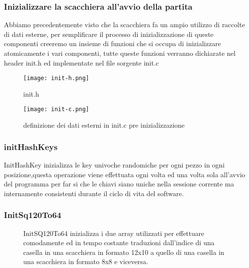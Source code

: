 \subsubsection{Inizializzare la scacchiera all'avvio della partita}
Abbiamo precedentemente visto che la scacchiera fa un ampio utilizzo di raccolte di dati esterne, per semplificare il processo di inizializzazione di queste componenti creeremo un insieme di funzioni che si occupa di inizializzare atomicamente i vari componenti, tutte queste funzioni verranno dichiarate nel header init.h ed implementate nel file sorgente init.c

\begin{figure}[h]
    \centering
    \begin{minipage}[b]{0.4\textwidth}
        \texttt{[image: init-h.png]}
        \caption{init.h}
    \end{minipage}
    \hfill
    \begin{minipage}[b]{0.4\textwidth}
        \texttt{[image: init-c.png]}
        \caption{definizione dei dati esterni in init.c pre inizializzazione }
    \end{minipage}
\end{figure}


\subsubsection{initHashKeys}
\small{InitHashKey inizializza le key univoche randomiche per ogni pezzo in ogni posizione,questa operazione viene effettuata ogni volta ed una volta sola all'avvio del programma per far si che le chiavi siano uniche nella sessione corrente ma internamente consistenti durante il ciclo di vita del software. }
\begin{figure}[h]
 
        \centering {}
\end{figure}

\newpage

\subsubsection{InitSq120To64}
\FloatBarrier
\begin{figure}[h]
    \begin{minipage}[t]{0.63\textwidth}
        \centering {}
    \end{minipage}
    \begin{minipage}[t]{0.35\textwidth}
        {InitSQ120To64 inizializza i due array utilizzati per effettuare comodamente ed in tempo costante traduzioni dall'indice di una casella in una scacchiera in formato 12x10 a quello di una casella in una scacchiera in formato 8x8 e viceversa. }
    \end{minipage}
\end{figure}
\FloatBarrier

